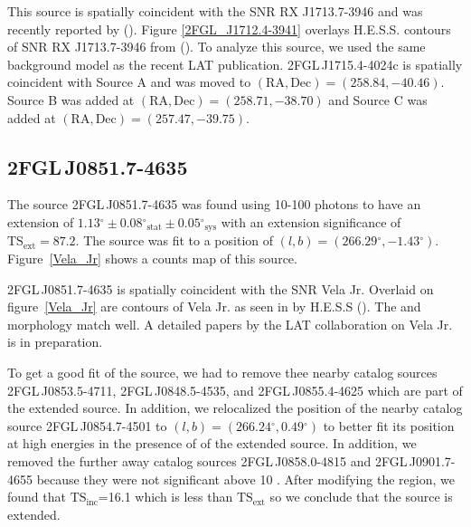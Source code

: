 \documentclass[12pt,preprint]{aastex}
\newcommand{\gev}{\text{GeV}\xspace}
\newcommand{\tev}{\text{TeV}\xspace}
\newcommand{\tsext}{{\ensuremath{\text{TS}_{\text{ext}}}}\xspace}
\newcommand{\tsinc}{\ensuremath{\text{TS}_{\text{inc}}}\xspace}
\newcommand{\sys}{\text{sys}\xspace}
\newcommand{\stat}{\text{stat}\xspace}
\renewcommand{\deg}{\ensuremath{^\circ}\xspace}
\begin{document}
This source is spatially coincident with the SNR RX J1713.7-3946
and was recently reported by (\cite{rx_j1713_lat}).  Figure
\ref{2FGL_J1712.4-3941} overlays H.E.S.S. \tev contours of SNR RX
J1713.7-3946 from (\cite{rx_j1713_hess}).  To analyze this source,
we used the same background model as the recent LAT publication.
2FGL\,J1715.4-4024c is spatially coincident with Source A and was
moved to $(\text{RA},\text{Dec})=(258.84,-40.46)$. Source B was added
at $(\text{RA},\text{Dec})=(258.71,-38.70)$ and Source C was added at
$(\text{RA},\text{Dec})=(257.47,-39.75)$.

\subsection{2FGL\,J0851.7-4635}
\label{section_2FGL_J0851.7-4635}


The source 2FGL\,J0851.7-4635 was found 
using 10-100 \gev photons to have an
extension of $1.13\deg\pm0.08\deg_\stat\pm0.05\deg_\sys$ 
with an extension
significance of $\tsext=87.2$.  The source was fit to a position of
$(l,b)=(266.29\deg,-1.43\deg)$.  Figure~\ref{Vela_Jr} shows a counts
map of this source.

2FGL\,J0851.7-4635 is spatially coincident with the SNR Vela Jr.
Overlaid on figure~\ref{Vela_Jr} are contours of Vela Jr. as seen in
\tev by H.E.S.S (\cite{vela_jr_hess}).  The \gev and \tev morphology
match well.  A detailed papers by the LAT collaboration on Vela Jr. is
in preparation.

To get a good fit of the source, we had to remove thee nearby catalog
sources 2FGL\,J0853.5-4711, 2FGL\,J0848.5-4535, and 2FGL\,J0855.4-4625
which are part of the extended source.  In addition, we relocalized
the position of the nearby catalog source 2FGL\,J0854.7-4501 to
$(l,b)=(266.24\deg,0.49\deg)$ to better fit its position at high energies
in the presence of of the extended source.  In addition, we removed the
further away catalog sources 2FGL\,J0858.0-4815 and 2FGL\,J0901.7-4655
because they were not significant above 10 \gev.  After modifying
the region, we found that \tsinc=16.1 which is less than \tsext so we
conclude that the source is extended. 
\end{document}
